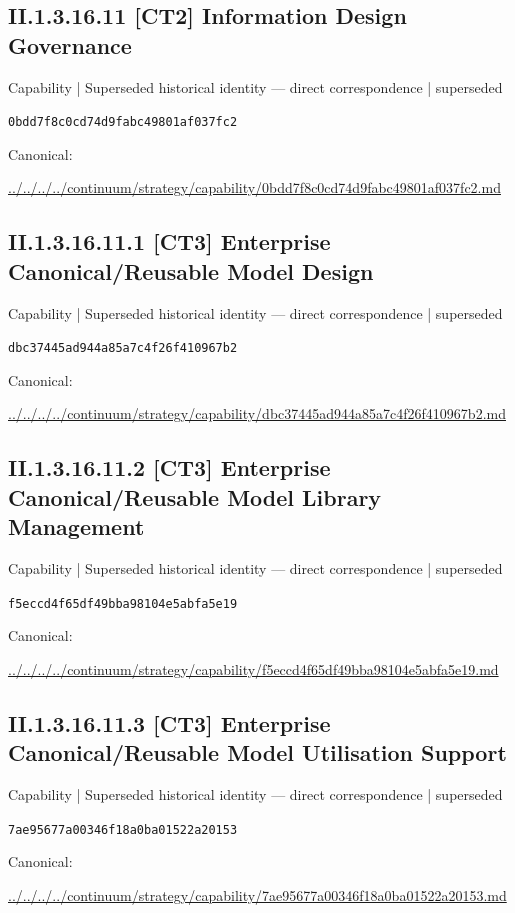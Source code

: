 \documentclass[10pt,a4paper]{article}
\begin{document}
\subsection*{II.1.3.16.11 [CT2] Information Design Governance}
{\small Capability | Superseded historical identity — direct correspondence | superseded}\par
\texttt{0bdd7f8c0cd74d9fabc49801af037fc2}\par
Canonical: \par
{\footnotesize\url{../../../../continuum/strategy/capability/0bdd7f8c0cd74d9fabc49801af037fc2.md}}\par
\subsection*{II.1.3.16.11.1 [CT3] Enterprise Canonical/Reusable Model Design}
{\small Capability | Superseded historical identity — direct correspondence | superseded}\par
\texttt{dbc37445ad944a85a7c4f26f410967b2}\par
Canonical: \par
{\footnotesize\url{../../../../continuum/strategy/capability/dbc37445ad944a85a7c4f26f410967b2.md}}\par
\subsection*{II.1.3.16.11.2 [CT3] Enterprise Canonical/Reusable Model Library Management}
{\small Capability | Superseded historical identity — direct correspondence | superseded}\par
\texttt{f5eccd4f65df49bba98104e5abfa5e19}\par
Canonical: \par
{\footnotesize\url{../../../../continuum/strategy/capability/f5eccd4f65df49bba98104e5abfa5e19.md}}\par
\subsection*{II.1.3.16.11.3 [CT3] Enterprise Canonical/Reusable Model Utilisation Support}
{\small Capability | Superseded historical identity — direct correspondence | superseded}\par
\texttt{7ae95677a00346f18a0ba01522a20153}\par
Canonical: \par
{\footnotesize\url{../../../../continuum/strategy/capability/7ae95677a00346f18a0ba01522a20153.md}}\par
\end{document}
